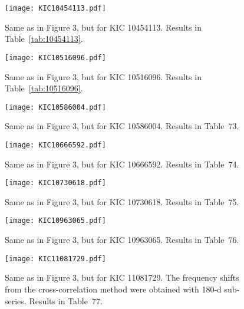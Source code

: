 \documentclass[twocolumn]{aastex61}%
\begin{document}
\begin{figure}[ht]
\texttt{[image: KIC10454113.pdf]}
\caption{Same as in Figure 3, but for KIC 10454113. Results in Table~\ref{tab:10454113}.}\label{fig:10454113}
\end{figure}

\begin{figure}[ht]
\texttt{[image: KIC10516096.pdf]}\vspace{-0.2cm}
\caption{Same as in Figure 3, but for KIC 10516096. Results in Table~\ref{tab:10516096}.}\label{fig:10516096}
\end{figure}

\begin{figure}[ht]
\texttt{[image: KIC10586004.pdf]}\vspace{-0.2cm}
\caption{Same as in Figure 3, but for KIC 10586004. Results in Table~73.}\label{fig:10586004}\vspace{-1cm}%
\end{figure}

\FloatBarrier
\nopagebreak
\begin{figure}[ht]
\texttt{[image: KIC10666592.pdf]}\vspace{-0.3cm}
\caption{Same as in Figure 3, but for KIC 10666592. Results in Table~74.}\label{fig:10666592}\vspace{-0.3cm}%
\end{figure}

\begin{figure}[ht]
\texttt{[image: KIC10730618.pdf]}\vspace{-0.3cm}
\caption{Same as in Figure 3, but for KIC 10730618. Results in Table~75.}\label{fig:10730618}\vspace{-1.5cm}%
\end{figure}

\begin{figure}[ht]
\texttt{[image: KIC10963065.pdf]}
\caption{Same as in Figure 3, but for KIC 10963065. Results in Table~76.}\label{fig:10963065}%
\end{figure}

\begin{figure}[ht]
\texttt{[image: KIC11081729.pdf]}
\caption{Same as in Figure 3, but for KIC 11081729. The frequency shifts from the cross-correlation method were obtained with 180-d sub-series. Results in Table~77.}\label{fig:11081729}%
\end{figure}
\end{document}
